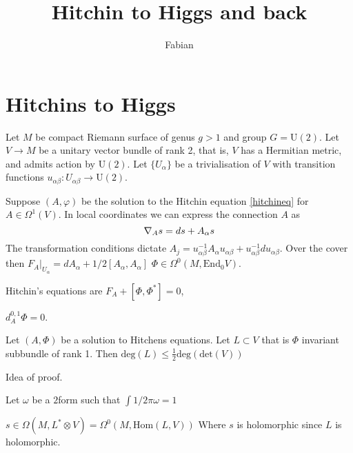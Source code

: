 % 

\title{Hitchin to Higgs and back}
\author{Fabian}
\date{}

 
\maketitle
\Large

\section{Hitchins to Higgs} %

Let $M$ be compact Riemann surface of genus $g > 1$ and group $ G  = \mathrm{U}(2) $.
Let $ V \rightarrow M $ be a unitary vector bundle of rank 2, that is, $V$ has a Hermitian metric, and admits action by $\mathrm{U}(2)$.
Let $\{U_{\alpha} \} $ be a trivialisation of $V$ with transition functions 
$ u_{\alpha \beta} : U_{\alpha \beta} \rightarrow  \mathrm{U}(2) $. 

Suppose $ (A, \varphi) $ be the solution to the Hitchin equation \ref{hitchineq} for $A \in \Omega^1(V)$.
In local coordinates we can express the connection $A$ as 
\begin{equation}
    \nabla _{ A} s = ds + A_{\alpha} s \\
\end{equation}
The transformation conditions dictate $ A_j = u_{\alpha \beta} ^{-1} A_{\alpha} u_{\alpha \beta}  +  u_{\alpha \beta} ^{-1} d u_{\alpha \beta}$. 
Over the cover then $ F_A |_{U_{\alpha} }  = d A_{\alpha} + 1/2 [A_{\alpha} , A_{\alpha}] $
$ \Phi \in \Omega ^0 (M , \mathrm{End}_0 V) $.


Hitchin's equations are
$F_A + [ \Phi , \Phi^* ] =0 $,

$d_A ^{0,1} \Phi = 0 $. 

\begin{theorem}
    Let $( A,  \Phi ) $ be a solution to Hitchens equations. 
    Let $ L \subset V $ that is $ \Phi $ invariant subbundle of rank 1. 
    Then $ \mathrm{deg} (L ) \leq \frac{1}{2} \mathrm{deg} ( \mathrm{det} ( V) ) $ 
\end{theorem}

Idea of proof. 

Let $\omega $ be a $2$form such that 
$ \int 1/2 \pi \omega  = 1$ 

$ s \in \Omega( M, L^* \otimes V ) = \Omega ^0 ( M , \mathrm{Hom}(L, V) ) $ 
Where $s$ is holomorphic since $L$ is holomorphic. 

